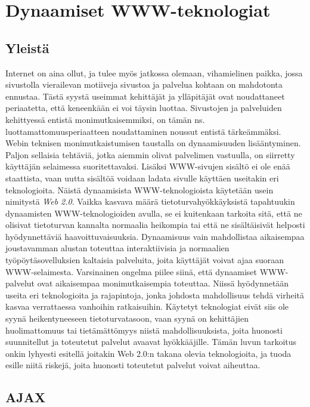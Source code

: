 
\chapter{Dynaamiset WWW-teknologiat}

\section{Yleistä}

Internet on aina ollut, ja tulee myös jatkossa olemaan, vihamielinen paikka, jossa sivustolla vierailevan motiiveja sivustoa ja palvelua kohtaan on mahdotonta ennustaa. Tästä syystä 
useimmat kehittäjät ja ylläpitäjät ovat noudattaneet periaatetta, että keneenkään ei voi täysin luottaa. Sivustojen ja palveluiden kehittyessä entistä monimutkaisemmiksi, on tämän 
ns. luottamattomuusperiaatteen noudattaminen noussut entistä tärkeämmäksi. Webin teknisen monimutkaistumisen taustalla on dynaamisuuden lisääntyminen. Paljon sellaisia tehtäviä, jotka
aiemmin olivat palvelimen vastuulla, on siirretty käyttäjän selaimessa suoritettavaksi. Lisäksi WWW-sivujen sisältö ei ole enää staattista, vaan uutta sisältöä voidaan ladata sivulle
käyttäen useitakin eri teknologioita. Näistä dynaamisista WWW-teknologioista käytetään usein nimitystä \emph{Web 2.0}. Vaikka kasvava määrä tietoturvahyökkäyksistä tapahtuukin 
dynaamisten WWW-teknologioiden avulla, se ei kuitenkaan tarkoita sitä, että ne olisivat tietoturvan kannalta normaalia heikompia tai että ne sisältäisivät helposti hyödynnettäviä 
haavoittuvaisuuksia. Dynaamisuus vain mahdollistaa aikaisempaa joustavamman alustan toteuttaa interaktiivisia ja normaalien työpöytäsovelluksien kaltaisia palveluita, joita käyttäjät 
voivat ajaa suoraan WWW-selaimesta. Varsinainen ongelma piilee siinä, että dynaamiset WWW-palvelut ovat aikaisempaa monimutkaisempia toteuttaa. Niissä hyödynnetään useita eri
teknologioita ja rajapintoja, jonka johdosta mahdollisuus tehdä virheitä kasvaa verrattaessa vanhoihin ratkaisuihin. Käytetyt teknologiat eivät siis ole syynä heikentyneeseen 
tietoturvatasoon, vaan syynä on kehittäjien huolimattomuus tai tietämättömyys niistä mahdollisuuksista, joita huonosti suunnitellut ja toteutetut palvelut avaavat hyökkääjille. Tämän
luvun tarkoitus onkin lyhyesti esitellä joitakin Web 2.0:n takana olevia teknologioita, ja tuoda esille niitä riskejä, joita huonosti toteutetut palvelut voivat aiheuttaa.

\section {AJAX}

